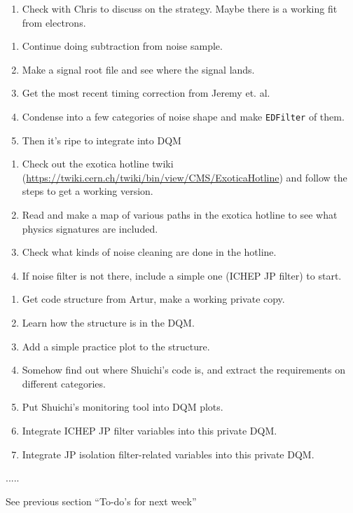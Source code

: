 
\begin{enumerate}
\item Check with Chris to discuss on the strategy.  Maybe there is a working fit from electrons.
\end{enumerate}


\begin{enumerate}
\item Continue doing subtraction from noise sample.
\item Make a signal root file and see where the signal lands.
\item Get the most recent timing correction from Jeremy et. al.
\item Condense into a few categories of noise shape and make \texttt{EDFilter} of them.
\item Then it's ripe to integrate into DQM
\end{enumerate}


\begin{enumerate}
\item Check out the exotica hotline twiki (\url{https://twiki.cern.ch/twiki/bin/view/CMS/ExoticaHotline}) and follow the steps to get a working version.
\item Read and make a map of various paths in the exotica hotline to see what physics signatures are included.
\item Check what kinds of noise cleaning are done in the hotline.
\item If noise filter is not there, include a simple one (ICHEP JP filter) to start.
\end{enumerate}


\begin{enumerate}
\item Get code structure from Artur, make a working private copy.
\item Learn how the structure is in the DQM.
\item Add a simple practice plot to the structure.
\item Somehow find out where Shuichi's code is, and extract the requirements on different categories.
\item Put Shuichi's monitoring tool into DQM plots.
\item Integrate ICHEP JP filter variables into this private DQM.
\item Integrate JP isolation filter-related variables into this private DQM.
\end{enumerate}



.....


See previous section ``To-do's for next week''


